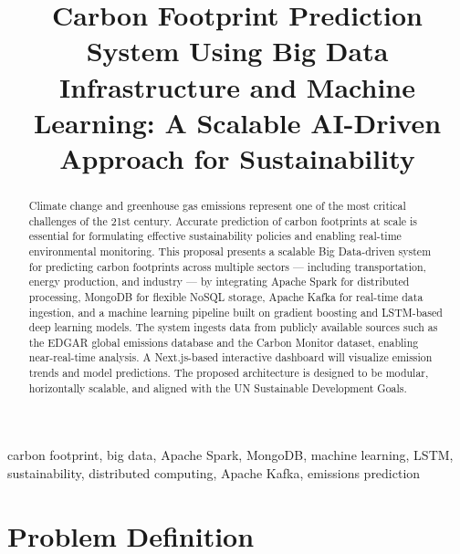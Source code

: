 \documentclass[conference]{IEEEtran}
\begin{document}
\title{Carbon Footprint Prediction System Using Big Data Infrastructure and Machine Learning: A Scalable AI-Driven Approach for Sustainability}

\author{
}

\maketitle

\begin{abstract}
Climate change and greenhouse gas emissions represent one of the most critical challenges of the 21st century. Accurate prediction of carbon footprints at scale is essential for formulating effective sustainability policies and enabling real-time environmental monitoring. This proposal presents a scalable Big Data-driven system for predicting carbon footprints across multiple sectors — including transportation, energy production, and industry — by integrating Apache Spark for distributed processing, MongoDB for flexible NoSQL storage, Apache Kafka for real-time data ingestion, and a machine learning pipeline built on gradient boosting and LSTM-based deep learning models. The system ingests data from publicly available sources such as the EDGAR global emissions database and the Carbon Monitor dataset, enabling near-real-time analysis. A Next.js-based interactive dashboard will visualize emission trends and model predictions. The proposed architecture is designed to be modular, horizontally scalable, and aligned with the UN Sustainable Development Goals.
\end{abstract}

\begin{IEEEkeywords}
carbon footprint, big data, Apache Spark, MongoDB, machine learning, LSTM, sustainability, distributed computing, Apache Kafka, emissions prediction
\end{IEEEkeywords}

\section{Problem Definition}
\end{document}
